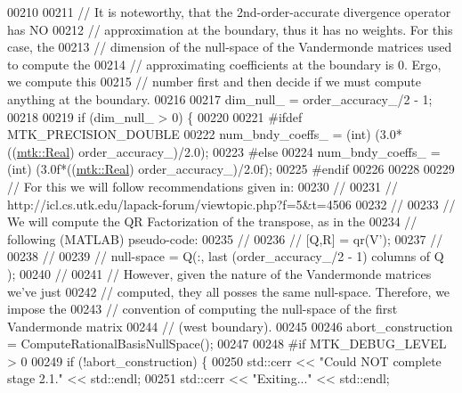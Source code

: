 \begin{DoxyCode}
00210 
00211   \textcolor{comment}{// It is noteworthy, that the 2nd-order-accurate divergence operator has NO}
00212   \textcolor{comment}{// approximation at the boundary, thus it has no weights. For this case, the}
00213   \textcolor{comment}{// dimension of the null-space of the Vandermonde matrices used to compute the}
00214   \textcolor{comment}{// approximating coefficients at the boundary is 0. Ergo, we compute this}
00215   \textcolor{comment}{// number first and then decide if we must compute anything at the boundary.}
00216 
00217   dim\_null\_ = order\_accuracy\_/2 - 1;
00218 
00219   \textcolor{keywordflow}{if} (dim\_null\_ > 0) \{
00220 
00221 \textcolor{preprocessor}{    #ifdef MTK\_PRECISION\_DOUBLE}
00222     num\_bndy\_coeffs\_ = (int) (3.0*((\hyperlink{group__c01-roots_gac080bbbf5cbb5502c9f00405f894857d}{mtk::Real}) order\_accuracy\_)/2.0);
00223 \textcolor{preprocessor}{    #else}
00224     num\_bndy\_coeffs\_ = (int) (3.0f*((\hyperlink{group__c01-roots_gac080bbbf5cbb5502c9f00405f894857d}{mtk::Real}) order\_accuracy\_)/2.0f);
00225 \textcolor{preprocessor}{    #endif}
00226 
00228 
00229     \textcolor{comment}{// For this we will follow recommendations given in:}
00230     \textcolor{comment}{//}
00231     \textcolor{comment}{// http://icl.cs.utk.edu/lapack-forum/viewtopic.php?f=5&t=4506}
00232     \textcolor{comment}{//}
00233     \textcolor{comment}{// We will compute the QR Factorization of the transpose, as in the}
00234     \textcolor{comment}{// following (MATLAB) pseudo-code:}
00235     \textcolor{comment}{//}
00236     \textcolor{comment}{// [Q,R] = qr(V'); %
00237     \textcolor{comment}{// %
00238     \textcolor{comment}{//}
00239     \textcolor{comment}{// null-space = Q(:, last (order\_accuracy\_/2 - 1) columns of Q );}
00240     \textcolor{comment}{//}
00241     \textcolor{comment}{// However, given the nature of the Vandermonde matrices we've just}
00242     \textcolor{comment}{// computed, they all posses the same null-space. Therefore, we impose the}
00243     \textcolor{comment}{// convention of computing the null-space of the first Vandermonde matrix}
00244     \textcolor{comment}{// (west boundary).}
00245 
00246     abort\_construction = ComputeRationalBasisNullSpace();
00247 
00248 \textcolor{preprocessor}{    #if MTK\_DEBUG\_LEVEL > 0}
00249     \textcolor{keywordflow}{if} (!abort\_construction) \{
00250       std::cerr << \textcolor{stringliteral}{"Could NOT complete stage 2.1."} << std::endl;
00251       std::cerr << \textcolor{stringliteral}{"Exiting..."} << std::endl;
}}
\end{DoxyCode}
